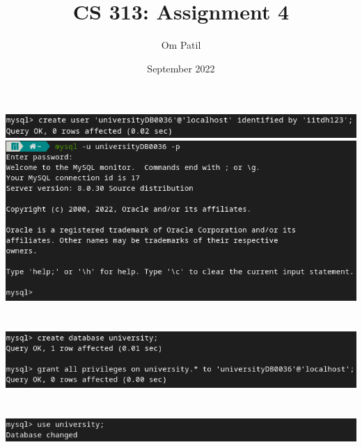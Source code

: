 \documentclass{article}
\title{CS 313: Assignment 4}
\author{Om Patil}
\date{September 2022}
\begin{document}
\maketitle

\section{}
\begin{center}
    \includegraphics[scale=0.6]{1-1.png}
    \includegraphics[scale=0.6]{1-2.png}
\end{center}

\section{}
\begin{center}
    \includegraphics[scale=0.6]{2.png}
\end{center}

\section{}
\begin{center}
    \includegraphics[scale=0.6]{3.png}
\end{center}
\end{document}
